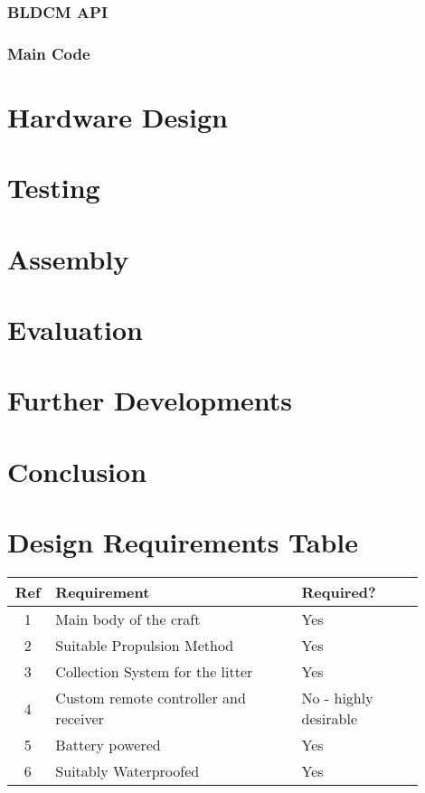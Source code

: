 \documentclass [11pt]{article}
\begin{document}
\subsubsection{BLDCM API}
\subsubsection{Main Code}

\section{Hardware Design}
\section{Testing}
\section{Assembly}
\section{Evaluation}
\section{Further Developments}
\section{Conclusion}

\newpage




\newpage
\appendix

\section{Design Requirements Table}\label{app:design_requirements_hardware}

\begin{table}[H]
\begin{tabular}{||c||p{0.6\linewidth}|p{0.3\linewidth}||}
\hline
Ref & Requirement                           & Required?             \\
\hline
1   & Main body of the craft                & Yes                   \\
\hline
2   & Suitable Propulsion Method            & Yes                   \\
\hline
3   & Collection System for the litter      & Yes                   \\
\hline
4   & Custom remote controller and receiver & No - highly desirable \\
\hline
5   & Battery powered                       & Yes                   \\
\hline
6   & Suitably Waterproofed                 & Yes\\
\hline              
\end{tabular}
\end{table}
\end{document}
